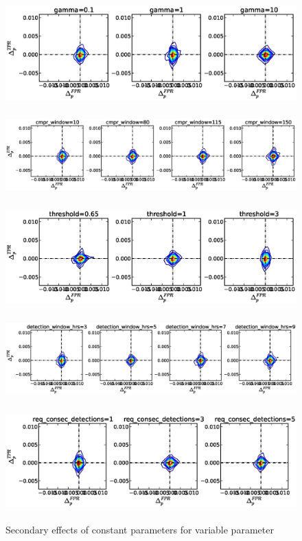 \begin{figure}[!h]
\begin{center}
\includegraphics[height=1.5in]{../fig/final/delta_hist_sec/w_smooth/gamma}
\includegraphics[height=1.5in]{../fig/final/delta_hist_sec/w_smooth/cmpr_window}
\includegraphics[height=1.5in]{../fig/final/delta_hist_sec/w_smooth/threshold}
\includegraphics[height=1.5in]{../fig/final/delta_hist_sec/w_smooth/detection_window_hrs}
\includegraphics[height=1.5in]{../fig/final/delta_hist_sec/w_smooth/req_consec_detections}
\end{center}
\caption{\label{fig:delta_sec4} Secondary effects of constant parameters for variable parameter }
\end{figure}

